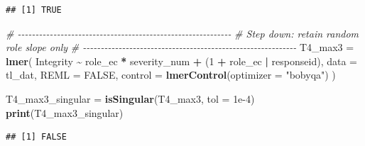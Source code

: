 \documentclass[
]{article}
\newenvironment{Shaded}{\begin{snugshade}}{\end{snugshade}}
\newcommand{\AttributeTok}[1]{\textcolor[rgb]{0.13,0.29,0.53}{#1}}
\newcommand{\CommentTok}[1]{\textcolor[rgb]{0.56,0.35,0.01}{\textit{#1}}}
\newcommand{\ConstantTok}[1]{\textcolor[rgb]{0.56,0.35,0.01}{#1}}
\newcommand{\DecValTok}[1]{\textcolor[rgb]{0.00,0.00,0.81}{#1}}
\newcommand{\FloatTok}[1]{\textcolor[rgb]{0.00,0.00,0.81}{#1}}
\newcommand{\FunctionTok}[1]{\textcolor[rgb]{0.13,0.29,0.53}{\textbf{#1}}}
\newcommand{\NormalTok}[1]{#1}
\newcommand{\OtherTok}[1]{\textcolor[rgb]{0.56,0.35,0.01}{#1}}
\newcommand{\SpecialCharTok}[1]{\textcolor[rgb]{0.81,0.36,0.00}{\textbf{#1}}}
\newcommand{\StringTok}[1]{\textcolor[rgb]{0.31,0.60,0.02}{#1}}
\begin{document}
\begin{verbatim}
## [1] TRUE
\end{verbatim}

\begin{Shaded}
\begin{Highlighting}[]
\CommentTok{\# {-}{-}{-}{-}{-}{-}{-}{-}{-}{-}{-}{-}{-}{-}{-}{-}{-}{-}{-}{-}{-}{-}{-}{-}{-}{-}{-}{-}{-}{-}{-}{-}{-}{-}{-}{-}{-}{-}{-}{-}{-}{-}{-}{-}{-}{-}{-}{-}{-}{-}{-}{-}{-}{-}{-}{-}{-}{-}{-}{-}}
\CommentTok{\# Step down: retain random role slope only}
\CommentTok{\# {-}{-}{-}{-}{-}{-}{-}{-}{-}{-}{-}{-}{-}{-}{-}{-}{-}{-}{-}{-}{-}{-}{-}{-}{-}{-}{-}{-}{-}{-}{-}{-}{-}{-}{-}{-}{-}{-}{-}{-}{-}{-}{-}{-}{-}{-}{-}{-}{-}{-}{-}{-}{-}{-}{-}{-}{-}{-}{-}{-}}
\NormalTok{T4\_max3 }\OtherTok{=} \FunctionTok{lmer}\NormalTok{(}
\NormalTok{  Integrity }\SpecialCharTok{\textasciitilde{}}\NormalTok{ role\_ec }\SpecialCharTok{*}\NormalTok{ severity\_num }\SpecialCharTok{+}
\NormalTok{    (}\DecValTok{1} \SpecialCharTok{+}\NormalTok{ role\_ec }\SpecialCharTok{|}\NormalTok{ responseid),}
  \AttributeTok{data =}\NormalTok{ tl\_dat,}
  \AttributeTok{REML =} \ConstantTok{FALSE}\NormalTok{,}
  \AttributeTok{control =} \FunctionTok{lmerControl}\NormalTok{(}\AttributeTok{optimizer =} \StringTok{"bobyqa"}\NormalTok{)}
\NormalTok{)}

\NormalTok{T4\_max3\_singular }\OtherTok{=} \FunctionTok{isSingular}\NormalTok{(T4\_max3, }\AttributeTok{tol =} \FloatTok{1e{-}4}\NormalTok{)}
\FunctionTok{print}\NormalTok{(T4\_max3\_singular)}
\end{Highlighting}
\end{Shaded}

\begin{verbatim}
## [1] FALSE
\end{verbatim}
\end{document}
